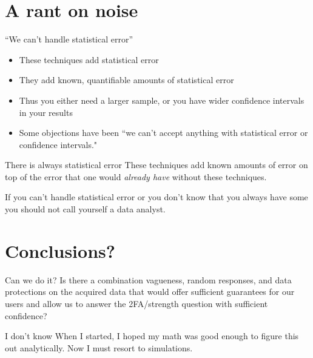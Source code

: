 \documentclass[xcolor={dvipsnames,table,hyperref}]{beamer}
\begin{document}
\section{A rant on noise}

\begin{frame}{“We can't handle statistical error”}
  \begin{itemize}
    \item These techniques add statistical error
    \item They add known, quantifiable amounts of statistical error
    \item Thus you either need a larger sample, or you have wider confidence intervals in your results
    \item Some objections have been “we can't accept anything with statistical error or confidence intervals."
  \end{itemize}

\end{frame}

\begin{frame}{There is always statistical error}
  These techniques add known amounts of error on top of the error that one would \emph{already have} without these techniques.
\end{frame}

\begin{frame}[standout]
  If you can't handle statistical error or you don't know that you always have some you should not call yourself a data analyst.
\end{frame}

\section{Conclusions?}

\begin{frame}{Can we do it?}
  Is there a combination vagueness, random responses, and data protections on the acquired data
  that would offer sufficient guarantees for our users
  and allow us to answer the 2FA/strength question with sufficient confidence?
\end{frame}

\begin{frame}{I don't know}
  When I started, I hoped my math was good enough to figure this out analytically. Now I must resort to simulations.
\end{frame}

\appendix
\end{document}
